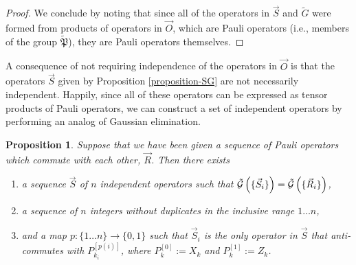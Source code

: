\documentclass[twocolumn,showpacs,preprintnumbers,amsmath,amssymb,nofootinbib,pra,floatfix]{revtex4-1}
\newtheorem{proposition}{Proposition}
\newenvironment{remark}[1][Remark]{\begin{trivlist}
\item[\hskip \labelsep {\bfseries #1}]}{\end{trivlist}}
\newcommand{\lst}{\vec}
\newcommand{\set}{\tilde}
\newcommand{\genfun}{\tilde{\mathcal{G}}}
\newcommand{\pauligroup}{{\set{\mathfrak{P}}}}
\begin{document}
\begin{proof}
We conclude by noting that since all of the operators in $\lst S$ and $\set G$ were formed from products of operators in $\lst O$, which are Pauli operators (i.e., members of the group $\pauligroup$), they are Pauli operators themselves.
\end{proof}
\begin{remark}
A consequence of not requiring independence of the operators in $\lst O$ is that the operators $\lst S$ given by Proposition \ref{proposition-SG} are not necessarily independent.  Happily, since all of these operators can be expressed as tensor products of Pauli operators, we can construct a set of independent operators by performing an analog of Gaussian elimination.
\end{remark}

\begin{proposition}
\label{make-independent-using-elimination}
Suppose that we have been given a sequence of Pauli operators which commute with each other, $\lst R$.  Then there exists
\begin{enumerate}
\item a sequence $\lst S$ of $n$ independent operators such that $\genfun\paren{\{\lst S_i\}}=\genfun\paren{\{\lst R_i\}}$,
\item a sequence of $n$ integers without duplicates in the inclusive range $1\dots n$,
\item and a map $p:\{1\dots n\} \to \{0,1\}$ such that $\lst S_i$ is the only operator in $\lst S$ that anti-commutes with $P_{k_i}^{[p(i)]}$, where $P_k^{[0]}:=X_k$ and $P_k^{[1]}:=Z_k$.
\end{enumerate}
\end{proposition}
\end{document}
